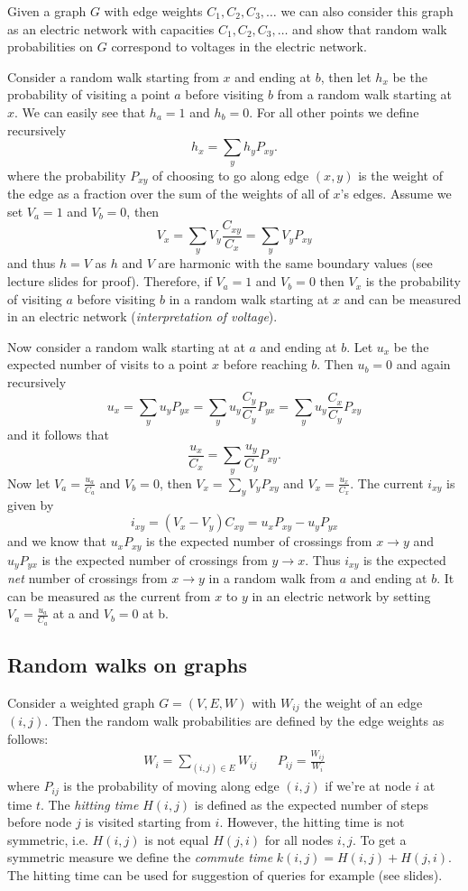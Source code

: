 Given a graph $G$ with edge weights $C_1, C_2, C_3, \ldots$ we can also consider this graph as an electric network with capacities $C_1, C_2, C_3, \ldots$ and show that random walk probabilities on $G$ correspond to voltages in the electric network.

Consider a random walk starting from $x$ and ending at $b$, then let $h_x$ be the probability of visiting a point $a$ before visiting $b$ from a random walk starting at $x$. We can easily see that $h_a = 1$ and $h_b = 0$. For all other points we define recursively 
$$
h_x = \sum_y h_y P_{xy}.
$$
where the probability $P_{xy}$ of choosing to go along edge $(x,y)$ is the weight of the edge as a fraction over the sum of the weights of all of $x$'s edges. Assume we set $V_a = 1$ and $V_b = 0$, then
$$
V_x = \sum_y V_y \frac{C_{xy}}{C_x} = \sum_y V_y P_{xy}
$$
and thus $h = V$ as $h$ and $V$ are harmonic with the same boundary values (see lecture slides for proof). Therefore, if $V_a = 1$ and $V_b = 0$ then $V_x$ is the probability of visiting $a$ before visiting $b$ in a random walk starting at $x$ and can be measured in an electric network (\emph{interpretation of voltage}).

Now consider a random walk starting at at $a$ and ending at $b$. Let $u_x$ be the expected number of visits to a point $x$ before reaching $b$. Then $u_b = 0$ and again recursively
$$
u_x = \sum_y u_y P_{yx} = \sum_y u_y \frac{C_y}{C_y} P_{yx} = \sum_y u_y \frac{C_x}{C_y} P_{xy} 
$$
and it follows that
$$
\frac{u_x}{C_x} = \sum_y \frac{u_y}{C_y} P_{xy}.
$$
Now let $V_a = \frac{u_a}{C_a}$ and $V_b = 0$, then $V_x = \sum_y V_y P_{xy}$ and $V_x = \frac{u_x}{C_x}$. The current $i_{xy}$ is given by
$$
i_{xy} = (V_x - V_y) C_{xy} = u_x P_{xy} - u_y P_{yx}
$$
and we know that $u_x P_{xy}$ is the expected number of crossings from $x \rightarrow y$ and $u_y P_{yx}$ is the expected number of crossings from $y \rightarrow x$. Thus $i_{xy}$ is the expected \emph{net} number of crossings from $x \rightarrow y$ in a random walk from $a$ and ending at $b$. It can be measured as the current from $x$ to $y$ in an electric network by setting $V_a = \frac{u_a}{C_a}$ at a and $V_b = 0$ at b.

\subsection{Random walks on graphs}
\bigskip

Consider a weighted graph $G = (V, E, W)$ with $W_{ij}$ the weight of an edge $(i,j)$. Then the random walk probabilities are defined by the edge weights as follows:
\begin{align*}
    W_i = \sum_{(i,j) \in E} W_{ij} && P_{ij} = \frac{W_{ij}}{W_i}
\end{align*}
where $P_{ij}$ is the probability of moving along edge $(i,j)$ if we're at node $i$ at time $t$. The \emph{hitting time} $H(i,j)$ is defined as the expected number of steps before node $j$ is visited starting from $i$. However, the hitting time is not symmetric, i.e. $H(i,j)$ is not equal $H(j,i)$ for all nodes $i,j$. To get a symmetric measure we define the \emph{commute time} $k(i,j) = H(i,j) + H(j,i)$. The hitting time can be used for suggestion of queries for example (see slides).

